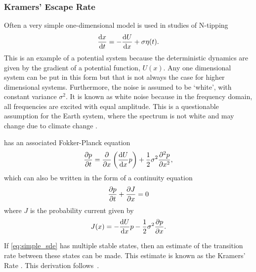 \subsubsection{Kramers' Escape Rate}
Often a very simple one-dimensional model is used in studies of N-tipping
\begin{equation}
  \label{eq:simple_sde}
  \dv{x}{t} = -\dv{U}{x} + \sigma \eta(t).
\end{equation}
This is an example of a potential system because the deterministic dynamics are given by the gradient of a potential function, $U(x)$. Any one dimensional system can be put in this form
but that is not always the case for higher dimensional systems.
Furthermore, the noise is assumed to be `white', with constant variance $\sigma^2$. It is known as white noise because in the frequency domain, all
frequencies are excited with equal amplitude. This is a questionable assumption for the Earth system, where the spectrum is not white \parencite{Mitchell1976,VonderHeydt2021} and may
change due to climate change \parencite{Huntingford2013}.

 has an associated Fokker-Planck equation
\begin{equation}
  \label{eq:fokker_planck_one_d}
  \pdv{p}{t} = \pdv{x} \left(\dv{U}{x}p\right) + \frac{1}{2}\sigma^2 \pdv[2]{p}{x},
\end{equation}
which can also be written in the form of a continuity equation
\begin{equation}
  \label{eq:fokker_planck_continuity}
  \pdv{p}{t} + \pdv{J}{x} = 0
\end{equation}
where $J$ is the probability current given by
\begin{equation}
  \label{eq:probability_current}
  J(x) = -\dv{U}{x}p - \frac{1}{2}\sigma^2 \pdv{p}{x}.
\end{equation}

If \cref{eq:simple_sde} has multiple stable states, then an estimate of the transition rate between these states can be made. This estimate is known
as the Kramers' Rate \parencite{Kramers1940}. This derivation follows~\cite{Risken1984}.

